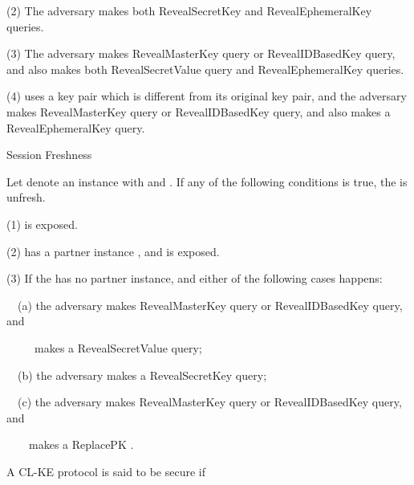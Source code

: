 \documentclass[final,1p,times,twocolumn]{elsarticle}
\begin{document}
(2) The adversary makes both RevealSecretKey and RevealEphemeralKey queries.

\vspace{0.1cm}

(3) The adversary makes RevealMasterKey query or RevealIDBasedKey query, and also makes both RevealSecretValue query and RevealEphemeralKey queries.

\vspace{0.1cm}

(4)  uses a  key pair which is different from its original key pair, and the adversary makes RevealMasterKey query or RevealIDBasedKey query, and also makes a RevealEphemeralKey query.

\vspace{0.2cm}

\noindent  Session  Freshness

\vspace{0.1cm}

Let  denote an instance with  and . If any of the following conditions is true, the  is unfresh.

\vspace{0.1cm}

(1)  is exposed.

\vspace{0.1cm}

(2)  has a partner instance , and  is exposed.

\vspace{0.1cm}

(3) If the  has no partner instance, and either of the following cases happens:

\vspace{0.1cm}

\ \ (a) the adversary makes RevealMasterKey query or RevealIDBasedKey query, and

\ \ \ \ \ makes a RevealSecretValue query;

\vspace{0.1cm}

\ \  (b) the adversary makes a RevealSecretKey  query;

\vspace{0.1cm}

\ \ (c) the adversary makes RevealMasterKey query or RevealIDBasedKey query, and

\ \ \ \  makes a ReplacePK .

\vspace{0.2cm}

\noindent  A CL-KE protocol is said to be secure if
\end{document}
